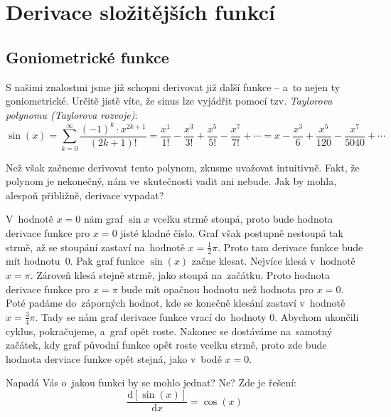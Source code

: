 \vfill{}
\pagebreak
\section{Derivace složitějších funkcí}

\subsection{Goniometrické funkce}

S našimi znalostmi jsme již schopni derivovat již další funkce -- a~to nejen ty goniometrické. Určitě jistě víte, že sinus lze vyjádřit pomocí tzv. \emph{Taylorova polynomu (Taylorova rozvoje)}:
\begin{equation*}
    \sin(x)
    = \sum_{k=0}^{\infty} \frac{(-1)^k \cdot x^{2k + 1}}{(2k + 1)!}
    = \frac{x^1}{1!} - \frac{x^3}{3!} + \frac{x^5}{5!} - \frac{x^7}{7!} + \cdots
    = x - \frac{x^3}{6} + \frac{x^5}{120} - \frac{x^7}{5040} + \cdots
\end{equation*}

Než však začneme derivovat tento polynom, zkusme uvažovat intuitivně. Fakt, že polynom je nekonečný, nám ve~skutečnosti vadit ani nebude. Jak by mohla, alespoň přibližně, derivace vypadat? 

V~hodnotě $x = 0$ nám graf $\sin x$ vcelku strmě stoupá, proto bude hodnota derivace funkce pro $x = 0$ jisté kladné číslo. Graf však postupně nestoupá tak strmě, až se stoupání zastaví na~hodnotě $x = \frac12 \pi$. Proto tam derivace funkce bude mít hodnotu~0. Pak graf funkce $\sin(x)$ začne klesat. Nejvíce klesá v~hodnotě $x = \pi$. Zároveň klesá stejně strmě, jako stoupá na~začátku. Proto hodnota derivace funkce pro $x = \pi$ bude mít opačnou hodnotu než hodnota pro $x = 0$. Poté padáme do~záporných hodnot, kde se konečně klesání zastaví v~hodnotě $x = \frac34 \pi$. Tady se nám graf derivace funkce vrací do~hodnoty 0. Abychom ukončili cyklus, pokračujeme, a~graf opět roste. Nakonec se dostáváme na~samotný začátek, kdy graf původní funkce opět roste vcelku strmě, proto zde bude hodnota derviace funkce opět stejná, jako v~bodě $x = 0$. 

Napadá Vás o~jakou funkci by se mohlo jednat? Ne? Zde je řešení:
\begin{equation*}
    \frac{\text{d}[\sin(x)]}{\text{d}x} = \cos(x)
\end{equation*}

